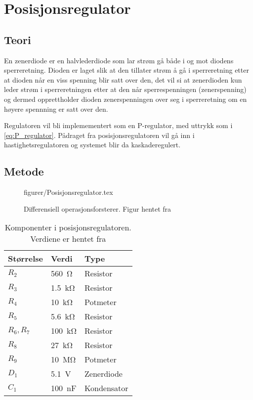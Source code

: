\section{Posisjonsregulator}\label{sec:posisjonsregulator}

\subsection{Teori}


En zenerdiode er en halvlederdiode som lar strøm gå både i og mot diodens sperreretning. Dioden er laget slik at den tillater strøm å gå i sperreretning etter at dioden når en viss spenning blir satt over den, det vil si at zenerdioden kun leder strøm i sperreretningen etter at den når sperrespenningen (zenerspenning) og dermed opprettholder dioden zenerspenningen over seg i sperreretning om en høyere spennning er satt over den.

Regulatoren vil bli implemementert som en P-regulator, med uttrykk som i \eqref{eq:P_regulator}. Pådraget fra posisjonsregulatoren vil gå inn i hastighetsregulatoren og systemet blir da kaskaderegulert.








\subsection{Metode}

\begin{figure} [h]
    \centering
     {figurer/Posisjonsregulator.tex}
    \caption{Differensiell operasjonsforsterer. Figur hentet fra \cite{AnalogMotorlabbOppgaver}}
    \label{fig:Posisjonsregulator}
\end{figure}

\begin{table}[h]
    \centering
    \caption{Komponenter i posisjonsregulatoren. Verdiene er hentet fra \cite{AnalogMotorlabbOppgaver}}
    \begin{tabular}{lll}
        \toprule
		Størrelse & Verdi & Type \\
		\midrule
        $R_2$ & \SI{560}{\ohm} & Resistor \\
        $R_3$ & \SI{1.5}{\kilo\ohm} & Resistor\\
        $R_4$ & \SI{10}{\kilo\ohm} & Potmeter\\
        $R_5$ & \SI{5.6}{\kilo\ohm} & Resistor\\
        $R_6, R_7$ & \SI{100}{\kilo\ohm} & Resistor\\
        $R_8$ & \SI{27}{\kilo\ohm} & Resistor\\
        $R_9$ & \SI{10}{\mega\ohm} & Potmeter\\
        $D_1$ & \SI{5.1}{\volt} & Zenerdiode\\
        $C_1$ & \SI{100}{\nano\farad} & Kondensator\\
		\bottomrule
    \end{tabular}
    \label{tab:my_label}
\end{table}

